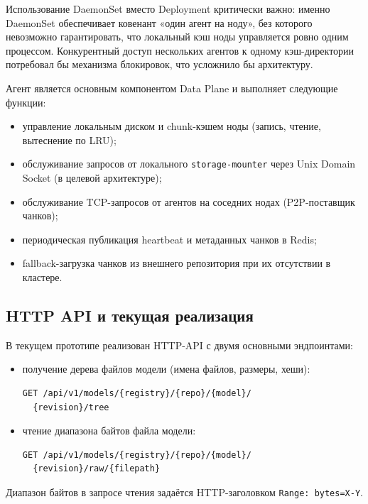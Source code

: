 Использование DaemonSet вместо Deployment критически важно: именно DaemonSet обеспечивает ковенант «один агент на ноду», без которого невозможно гарантировать, что локальный кэш ноды управляется ровно одним процессом. Конкурентный доступ нескольких агентов к одному кэш-директории потребовал бы механизма блокировок, что усложнило бы архитектуру.

Агент является основным компонентом Data Plane и выполняет следующие функции:

\begin{itemize}[leftmargin=*]
  \item управление локальным диском и chunk-кэшем ноды (запись, чтение, вытеснение по LRU);
  \item обслуживание запросов от локального \texttt{storage-mounter} через Unix Domain Socket (в целевой архитектуре);
  \item обслуживание TCP-запросов от агентов на соседних нодах (P2P-поставщик чанков);
  \item периодическая публикация heartbeat и метаданных чанков в Redis;
  \item fallback-загрузка чанков из внешнего репозитория при их отсутствии в кластере.
\end{itemize}

\subsection*{HTTP API и текущая реализация}

В текущем прототипе реализован HTTP-API с двумя основными эндпоинтами:

\begin{itemize}[leftmargin=*]
  \item получение дерева файлов модели (имена файлов, размеры, хеши):
\begin{lstlisting}[numbers=none,frame=none,basicstyle=\footnotesize\ttfamily,aboveskip=0pt,belowskip=0pt]
GET /api/v1/models/{registry}/{repo}/{model}/
  {revision}/tree
\end{lstlisting}
  \item чтение диапазона байтов файла модели:
\begin{lstlisting}[numbers=none,frame=none,basicstyle=\footnotesize\ttfamily,aboveskip=0pt,belowskip=0pt]
GET /api/v1/models/{registry}/{repo}/{model}/
  {revision}/raw/{filepath}
\end{lstlisting}
\end{itemize}

Диапазон байтов в запросе чтения задаётся HTTP-заголовком \texttt{Range: bytes=X-Y}.

